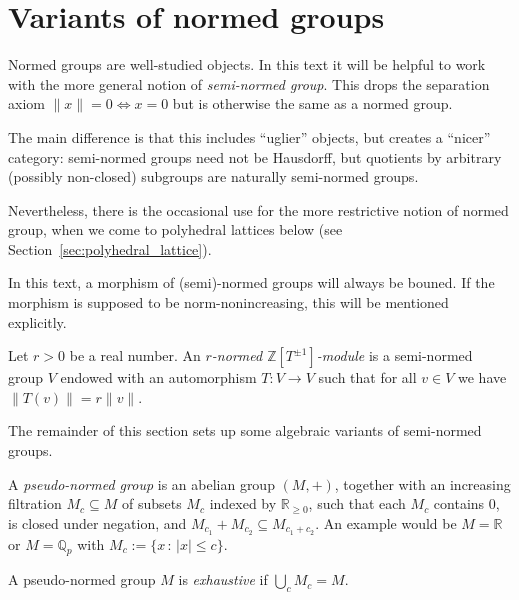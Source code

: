 \section{Variants of normed groups}
\label{sec:normed_groups}

\begin{remark}
  Normed groups are well-studied objects.
  In this text it will be helpful to work with
  the more general notion of \emph{semi-normed group}.
  This drops the separation axiom $\|x\| = 0 \iff x = 0$
  but is otherwise the same as a normed group.

  The main difference is that this includes ``uglier'' objects,
  but creates a ``nicer'' category:
  semi-normed groups need not be Hausdorff,
  but quotients by arbitrary (possibly non-closed) subgroups
  are naturally semi-normed groups.

  Nevertheless, there is the occasional use for the more restrictive
  notion of normed group, when we come to polyhedral lattices below
  (see Section~\ref{sec:polyhedral_lattice}).

  In this text, a morphism of (semi)-normed groups will always be bouned.
  If the morphism is supposed to be norm-nonincreasing,
  this will be mentioned explicitly.
\end{remark}

\begin{definition}
  \label{normed_with_aut}
  \leanok
  Let $r > 0$ be a real number.
  An \emph{$r$-normed $\mathbb Z[T^{\pm 1}]$-module}
  is a semi-normed group $V$
  endowed with an automorphism $T \colon V \to V$ such that
  for all $v \in V$ we have $\|T(v)\| = r\|v\|$.
\end{definition}

The remainder of this section sets up some algebraic variants of semi-normed groups.

\begin{definition}
  \label{pseudo_normed_group}
  \leanok
  A \emph{pseudo-normed group} is an abelian group $(M,+)$,
  together with an increasing filtration $M_c \subseteq M$ of subsets $M_c$ indexed by $\mathbb R_{\ge 0}$,
  such that each $M_c$ contains $0$, is closed under negation,
  and $M_{c_1} + M_{c_2} \subseteq M_{c_1 + c_2}$. An example would be $M=\mathbb{R}$ or $M=\mathbb{Q}_p$ with $M_c :=\{x\,:\,|x|\leq c\}$.

  A pseudo-normed group $M$ is \emph{exhaustive} if $\bigcup_c M_c = M$.
\end{definition}

